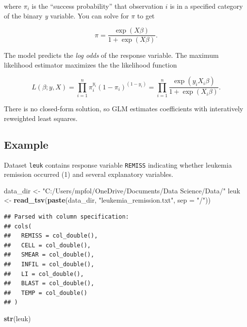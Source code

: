 \documentclass[
]{book}
\newenvironment{Shaded}{\begin{snugshade}}{\end{snugshade}}
\newcommand{\DataTypeTok}[1]{\textcolor[rgb]{0.13,0.29,0.53}{#1}}
\newcommand{\KeywordTok}[1]{\textcolor[rgb]{0.13,0.29,0.53}{\textbf{#1}}}
\newcommand{\NormalTok}[1]{#1}
\newcommand{\StringTok}[1]{\textcolor[rgb]{0.31,0.60,0.02}{#1}}
\begin{document}
where \(\pi_i\) is the ``success probability'' that observation \(i\) is in a specified category of the binary \emph{y} variable. You can solve for \(\pi\) to get

\[\pi = \frac{\exp(X \beta)}{1 + \exp(X \beta)}.\]

The model predicts the \emph{log odds} of the response variable. The maximum likelihood estimator maximizes the the likelihood function

\[L(\beta; y, X) = \prod_{i=1}^n \pi_i^{y_i}(1 - \pi_i)^{(1-y_i)} = \prod_{i=1}^n\frac{\exp(y_i X_i \beta)}{1 + \exp(X_i \beta)}.\]

There is no closed-form solution, so GLM estimates coefficients with interatively reweighted least squares.

\hypertarget{example-6}{%
\subsection*{Example}\label{example-6}}

Dataset \texttt{leuk} contains response variable \texttt{REMISS} indicating whether leukemia remission occurred (1) and several explanatory variables.

\begin{Shaded}
\begin{Highlighting}[]
\NormalTok{data_dir <-}\StringTok{ "C:/Users/mpfol/OneDrive/Documents/Data Science/Data/"}
\NormalTok{leuk <-}\StringTok{ }\KeywordTok{read_tsv}\NormalTok{(}\KeywordTok{paste}\NormalTok{(data_dir, }\StringTok{"leukemia_remission.txt"}\NormalTok{, }\DataTypeTok{sep =} \StringTok{"/"}\NormalTok{))}
\end{Highlighting}
\end{Shaded}

\begin{verbatim}
## Parsed with column specification:
## cols(
##   REMISS = col_double(),
##   CELL = col_double(),
##   SMEAR = col_double(),
##   INFIL = col_double(),
##   LI = col_double(),
##   BLAST = col_double(),
##   TEMP = col_double()
## )
\end{verbatim}

\begin{Shaded}
\begin{Highlighting}[]
\KeywordTok{str}\NormalTok{(leuk)}
\end{Highlighting}
\end{Shaded}
\end{document}
